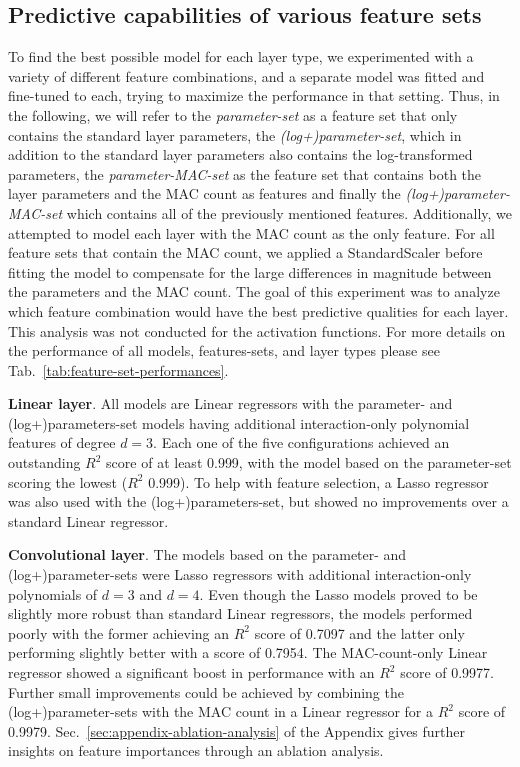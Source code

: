 \subsection{Predictive capabilities of various feature sets}
\label{sec:appendix-feature-sets-experiment}
To find the best possible model for each layer type, we experimented with a variety of different feature combinations, and a separate model was fitted and fine-tuned to each, trying to maximize the performance in that setting. Thus, in the following, we will refer to the \emph{parameter-set} as a feature set that only contains the standard layer parameters, the \emph{(log+)parameter-set}, which in addition to the standard layer parameters also contains the log-transformed parameters, the \emph{parameter-MAC-set} as the feature set that contains both the layer parameters and the MAC count as features and finally the \emph{(log+)parameter-MAC-set} which contains all of the previously mentioned features. Additionally, we attempted to model each layer with the MAC count as the only feature. For all feature sets that contain the MAC count, we applied a StandardScaler before fitting the model to compensate for the large differences in magnitude between the parameters and the MAC count. The goal of this experiment was to analyze which feature combination would have the best predictive qualities for each layer. This analysis was not conducted for the activation functions.  For more details on the performance of all models, features-sets, and layer types please see Tab.~\ref{tab:feature-set-performances}.

\textbf{Linear layer}. All models are Linear regressors with the parameter- and (log+)parameters-set models having additional interaction-only polynomial features of degree $d=3$. Each one of the five configurations achieved an outstanding $R^2$ score of at least 0.999, with the model based on the parameter-set scoring the lowest ($R^2$ 0.999). To help with feature selection, a Lasso regressor was also used with the (log+)parameters-set, but showed no improvements over a standard Linear regressor. 

\textbf{Convolutional layer}. The models based on the parameter- and (log+)parameter-sets were Lasso regressors with additional interaction-only polynomials of $d=3$ and $d=4$. Even though the Lasso models proved to be slightly more robust than standard Linear regressors, the models performed poorly with the former achieving an $R^2$ score of 0.7097 and the latter only performing slightly better with a score of 0.7954. The MAC-count-only Linear regressor showed a significant boost in performance with an $R^2$ score of 0.9977. Further small improvements could be achieved by combining the (log+)parameter-sets with the MAC count in a Linear regressor for a $R^2$ score of 0.9979. Sec.~\ref{sec:appendix-ablation-analysis} of the Appendix gives further insights on feature importances through an ablation analysis. 

